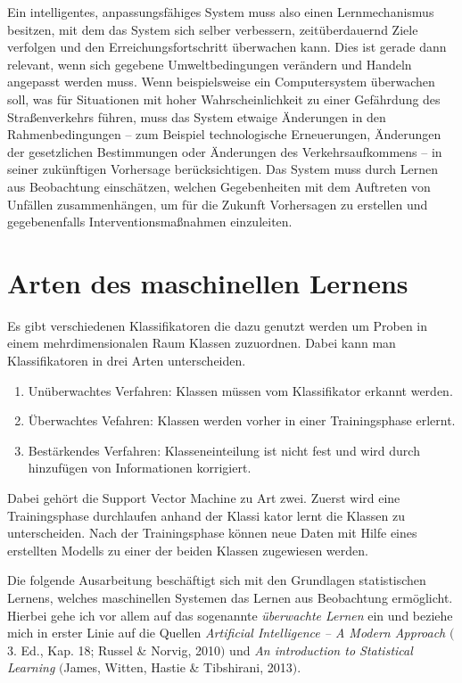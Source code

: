 Ein intelligentes, anpassungsfähiges System muss also einen Lernmechanismus besitzen,
mit dem das System sich selber verbessern, zeitüberdauernd Ziele verfolgen und den
Erreichungsfortschritt überwachen kann. Dies ist gerade dann relevant, wenn sich
gegebene Umweltbedingungen verändern und Handeln angepasst werden muss. Wenn
beispielsweise ein Computersystem überwachen soll, was für Situationen mit hoher
Wahrscheinlichkeit zu einer Gefährdung des Straßenverkehrs führen, muss das System
etwaige Änderungen in den Rahmenbedingungen -- zum Beispiel technologische
Erneuerungen, Änderungen der gesetzlichen Bestimmungen oder Änderungen des
Verkehrsaufkommens -- in seiner zukünftigen Vorhersage berücksichtigen. Das System
muss durch Lernen aus Beobachtung einschätzen, welchen Gegebenheiten mit dem
Auftreten von Unfällen zusammenhängen, um für die Zukunft Vorhersagen zu erstellen
und gegebenenfalls Interventionsmaßnahmen einzuleiten.

\section{Arten des maschinellen Lernens}
Es gibt verschiedenen Klassifikatoren die dazu genutzt werden um Proben in einem mehrdimensionalen Raum Klassen zuzuordnen.
Dabei kann man Klassifikatoren in drei Arten unterscheiden.
\begin{enumerate}
\item Unüberwachtes Verfahren: Klassen müssen vom Klassifikator erkannt werden.
\item Überwachtes Vefahren: Klassen werden vorher in einer Trainingsphase erlernt.
\item Bestärkendes Verfahren: Klasseneinteilung ist nicht fest und wird durch hinzufügen von Informationen korrigiert.
\end{enumerate}
Dabei gehört die Support Vector Machine zu Art zwei. Zuerst wird eine Trainingsphase durchlaufen anhand der Klassi kator lernt die Klassen zu unterscheiden. Nach der Trainingsphase können neue Daten mit Hilfe eines erstellten Modells zu einer der beiden Klassen zugewiesen werden.

Die folgende Ausarbeitung beschäftigt sich mit den Grundlagen statistischen Lernens,
welches maschinellen Systemen das Lernen aus Beobachtung ermöglicht. Hierbei gehe ich
vor allem auf das sogenannte \emph{überwachte Lernen} ein und beziehe mich in erster
Linie auf die Quellen \emph{Artificial Intelligence -- A Modern Approach} $($3. Ed.,
Kap. 18; Russel \& Norvig, 2010$)$ und \emph{An introduction to Statistical
  Learning} $($James, Witten, Hastie \& Tibshirani, 2013$)$.

